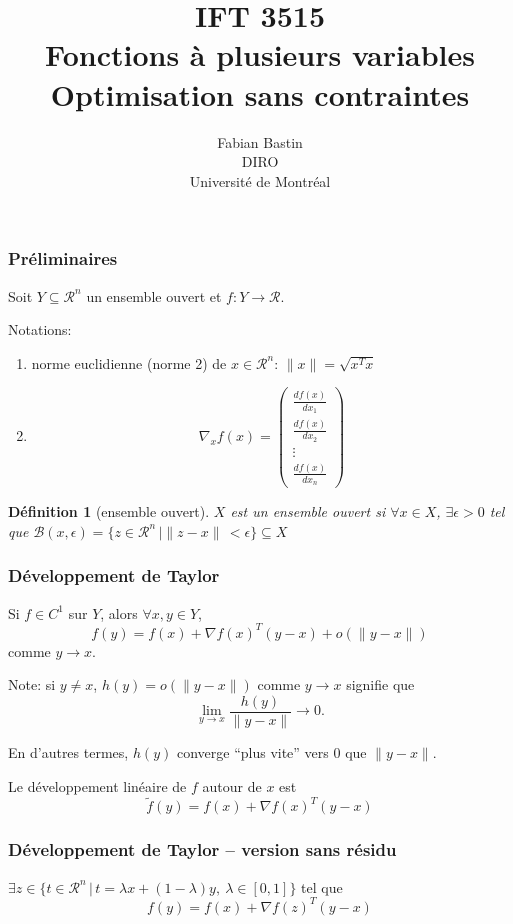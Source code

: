 \documentclass[usepdftitle=false]{beamer}
\title[IFT3515]{IFT 3515\\Fonctions à plusieurs variables\\Optimisation sans contraintes}
\author[Fabian Bastin]{Fabian Bastin\\DIRO\\Université de Montréal}
\date{}
\newtheorem{defn}{Définition}
\def\cB{\mathcal{B}}
\def\cR{\mathcal{R}}
\begin{document}
\frame{\titlepage}


\begin{frame}
\frametitle{Préliminaires}

Soit $Y \subseteq \cR^n$ un ensemble ouvert et $f: Y \rightarrow \cR$.

\mbox{}

Notations:
\begin{enumerate}
\item
norme euclidienne (norme 2) de $x \in \cR^n$: $\| x \| = \sqrt{ x^T x }$
\item
$$
\nabla_x f(x) = \begin{pmatrix} \frac{df(x)}{dx_1} \\ \frac{df(x)}{dx_2} \\ \vdots \\ \frac{df(x)}{dx_n} \end{pmatrix}
$$
\end{enumerate}

\begin{defn}[ensemble ouvert]
$X$ est un ensemble ouvert si $\forall x \in X$, $\exists \epsilon > 0$ tel que $\cB(x,\epsilon) = \lbrace z \in \cR^n \, |  \| z-x \| \, < \epsilon \rbrace \subseteq X$
\end{defn}

\end{frame}

\begin{frame}
\frametitle{Développement de Taylor}

Si $f \in C^1$ sur $Y$, alors $\forall x, y \in Y$,
$$
f(y) = f(x) + \nabla f(x)^T(y-x) + o(\| y - x \|)
$$
comme $y \rightarrow x$.

\mbox{}

Note: si $y \ne x$, $h(y) = o(\| y - x \|)$ comme $y \rightarrow x$ signifie que
$$
\lim_{y \rightarrow x} \frac{h(y)}{\| y - x \|} \rightarrow 0.
$$

En d'autres termes, $h(y)$ converge ``plus vite'' vers 0 que $\| y - x \|$.

\mbox{}

Le développement linéaire de $f$ autour de $x$ est 
$$
\tilde{f}(y) = f(x) + \nabla f(x)^T(y-x)
$$

\end{frame}

\begin{frame}
\frametitle{Développement de Taylor -- version sans résidu}

$\exists z \in \lbrace t \in \cR^n \,|\, t = \lambda x + (1-\lambda) y,\ \lambda \in [0,1] \rbrace$
tel que
$$
f(y) = f(x) + \nabla f(z)^T(y-x)
$$

\end{frame}
\end{document}
